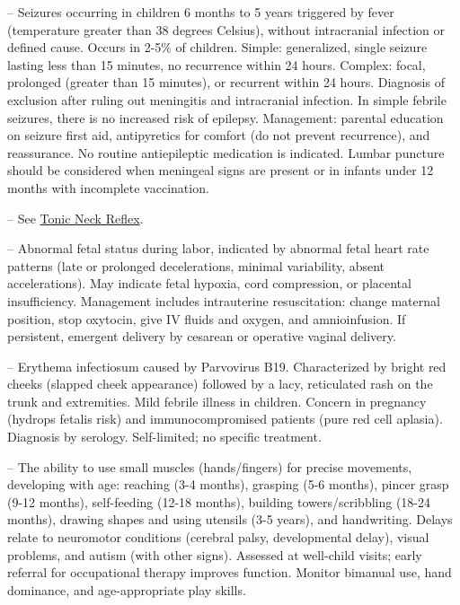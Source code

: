 -- Seizures occurring in children 6 months to 5 years triggered by fever (temperature greater than 38 degrees Celsius), without intracranial infection or defined cause. Occurs in 2-5\% of children. Simple: generalized, single seizure lasting less than 15 minutes, no recurrence within 24 hours. Complex: focal, prolonged (greater than 15 minutes), or recurrent within 24 hours. Diagnosis of exclusion after ruling out meningitis and intracranial infection. In simple febrile seizures, there is no increased risk of epilepsy. Management: parental education on seizure first aid, antipyretics for comfort (do not prevent recurrence), and reassurance. No routine antiepileptic medication is indicated. Lumbar puncture should be considered when meningeal signs are present or in infants under 12 months with incomplete vaccination.

-- See \hyperlink{Tonic Neck Reflex}{Tonic Neck Reflex}.

-- Abnormal fetal status during labor, indicated by abnormal fetal heart rate patterns (late or prolonged decelerations, minimal variability, absent accelerations). May indicate fetal hypoxia, cord compression, or placental insufficiency. Management includes intrauterine resuscitation: change maternal position, stop oxytocin, give IV fluids and oxygen, and amnioinfusion. If persistent, emergent delivery by cesarean or operative vaginal delivery.

-- Erythema infectiosum caused by Parvovirus B19. Characterized by bright red cheeks (slapped cheek appearance) followed by a lacy, reticulated rash on the trunk and extremities. Mild febrile illness in children. Concern in pregnancy (hydrops fetalis risk) and immunocompromised patients (pure red cell aplasia). Diagnosis by serology. Self-limited; no specific treatment.

-- The ability to use small muscles (hands/fingers) for precise movements, developing with age: reaching (3-4 months), grasping (5-6 months), pincer grasp (9-12 months), self-feeding (12-18 months), building towers/scribbling (18-24 months), drawing shapes and using utensils (3-5 years), and handwriting. Delays relate to neuromotor conditions (cerebral palsy, developmental delay), visual problems, and autism (with other signs). Assessed at well-child visits; early referral for occupational therapy improves function. Monitor bimanual use, hand dominance, and age-appropriate play skills.

